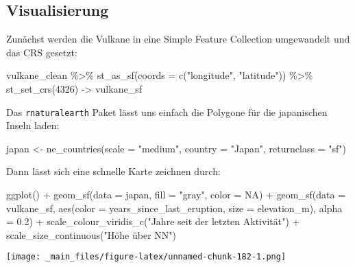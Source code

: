 \documentclass[
  ngerman,
]{article}
\newenvironment{Shaded}{\begin{snugshade}}{\end{snugshade}}
\newcommand{\AttributeTok}[1]{\textcolor[rgb]{0.77,0.63,0.00}{#1}}
\newcommand{\ConstantTok}[1]{\textcolor[rgb]{0.00,0.00,0.00}{#1}}
\newcommand{\DecValTok}[1]{\textcolor[rgb]{0.00,0.00,0.81}{#1}}
\newcommand{\FloatTok}[1]{\textcolor[rgb]{0.00,0.00,0.81}{#1}}
\newcommand{\FunctionTok}[1]{\textcolor[rgb]{0.00,0.00,0.00}{#1}}
\newcommand{\NormalTok}[1]{#1}
\newcommand{\OtherTok}[1]{\textcolor[rgb]{0.56,0.35,0.01}{#1}}
\newcommand{\SpecialCharTok}[1]{\textcolor[rgb]{0.00,0.00,0.00}{#1}}
\newcommand{\StringTok}[1]{\textcolor[rgb]{0.31,0.60,0.02}{#1}}
\begin{document}
\hypertarget{visualisierung}{%
\subsection{Visualisierung}\label{visualisierung}}

Zunächst werden die Vulkane in eine Simple Feature Collection umgewandelt und das CRS gesetzt:

\begin{Shaded}
\begin{Highlighting}[]
\NormalTok{vulkane\_clean }\SpecialCharTok{\%\textgreater{}\%}
  \FunctionTok{st\_as\_sf}\NormalTok{(}\AttributeTok{coords =} \FunctionTok{c}\NormalTok{(}\StringTok{"longitude"}\NormalTok{, }\StringTok{"latitude"}\NormalTok{)) }\SpecialCharTok{\%\textgreater{}\%}
  \FunctionTok{st\_set\_crs}\NormalTok{(}\DecValTok{4326}\NormalTok{) }\OtherTok{{-}\textgreater{}}\NormalTok{ vulkane\_sf}
\end{Highlighting}
\end{Shaded}

Das \texttt{rnaturalearth} Paket lässt uns einfach die Polygone für die japanischen Inseln laden:

\begin{Shaded}
\begin{Highlighting}[]
\NormalTok{japan }\OtherTok{\textless{}{-}} \FunctionTok{ne\_countries}\NormalTok{(}\AttributeTok{scale =} \StringTok{"medium"}\NormalTok{,}
                      \AttributeTok{country =} \StringTok{"Japan"}\NormalTok{,}
                      \AttributeTok{returnclass =} \StringTok{"sf"}\NormalTok{)}
\end{Highlighting}
\end{Shaded}

Dann lässt sich eine schnelle Karte zeichnen durch:

\begin{Shaded}
\begin{Highlighting}[]
\FunctionTok{ggplot}\NormalTok{() }\SpecialCharTok{+}
  \FunctionTok{geom\_sf}\NormalTok{(}\AttributeTok{data =}\NormalTok{ japan, }\AttributeTok{fill =} \StringTok{"gray"}\NormalTok{, }\AttributeTok{color =} \ConstantTok{NA}\NormalTok{) }\SpecialCharTok{+}
  \FunctionTok{geom\_sf}\NormalTok{(}\AttributeTok{data =}\NormalTok{ vulkane\_sf,}
          \FunctionTok{aes}\NormalTok{(}\AttributeTok{color =}\NormalTok{ years\_since\_last\_eruption,}
              \AttributeTok{size  =}\NormalTok{ elevation\_m),}
          \AttributeTok{alpha =} \FloatTok{0.2}\NormalTok{) }\SpecialCharTok{+}
  \FunctionTok{scale\_colour\_viridis\_c}\NormalTok{(}\StringTok{"Jahre seit der letzten Aktivität"}\NormalTok{) }\SpecialCharTok{+}
  \FunctionTok{scale\_size\_continuous}\NormalTok{(}\StringTok{"Höhe über NN"}\NormalTok{)}
\end{Highlighting}
\end{Shaded}

\texttt{[image: \_main\_files/figure-latex/unnamed-chunk-182-1.png]}
\end{document}
